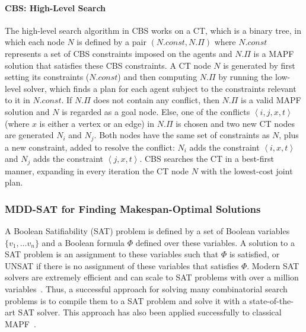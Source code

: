 \documentclass[review]{elsarticle}
\newcommand{\tuple}[1]{\ensuremath{\left \langle #1 \right \rangle }}
\newcommand\konstantin[1]{\nb{\textbf{Konstantin:}}{red}{#1}}
\newcommand\roni[1]{\nb{\textbf{Roni:}}{green}{#1}}
\newcommand{\cbs}{\ac{CBS}\xspace}
\newcommand{\ct}{\ac{CT}\xspace}
\newcommand{\mddsat}{MDD-SAT\xspace}
\newcommand{\mapf}{\ac{MAPF}\xspace}
\newcommand{\const}{\textit{const}\xspace}
\begin{document}
\paragraph{\textbf{\cbs: High-Level Search}}
The high-level search algorithm in \cbs works on a \ct, which is a binary tree, in which each node
$N$ is defined by a pair $(N.\const, N.\Pi)$ where 
$N.\const$ represents a set of \cbs constraints imposed on the agents and $N.\Pi$ is a \mapf solution that satisfies these \cbs constraints. A \ct node $N$ is generated by first setting its constraints ($N.\const$) and then 
computing $N.\Pi$ by running the low-level solver, which finds a plan for each agent subject to the constraints relevant to it in $N.\const$. If $N.\Pi$ does not contain any conflict, then $N.\Pi$ is a valid \mapf solution and $N$ is regarded as a goal node. Else, one of the conflicts $\tuple{i,j,x,t}$ (where $x$ is either a vertex or an edge) in $N.\Pi$ is chosen and two new \ct nodes are generated $N_i$ and $N_j$. Both nodes have the same set of constraints as $N$, plus a new constraint, added to resolve the conflict: $N_i$ adds the constraint $\tuple{i,x,t}$
and $N_j$ adds the constraint $\tuple{j,x,t}$. \cbs searches the \ct in a best-first manner, expanding in every iteration the \ct node $N$ with the lowest-cost joint plan. %


\subsubsection{\mddsat for Finding Makespan-Optimal Solutions}


A Boolean Satifiability (SAT) problem is defined by a set of Boolean variables $\{v_1,\ldots v_n\}$ and a Boolean formula $\Phi$ defined over these variables. 
A solution to a SAT problem is an assignment to these variables such that $\Phi$ is satisfied, or UNSAT if there is no assignment of these variables that satisfies $\Phi$. 
Modern SAT solvers are extremely efficient and can scale to SAT problems with over a million variables~\cite{DBLP:conf/sat/AudemardLS13,audemard2018glucose}.
Thus, a successful approach for solving many combinatorial search problems is to compile them to a SAT problem and solve it with a state-of-the-art SAT solver. This approach has also been applied successfully to classical \mapf~\cite{DBLP:conf/ecai/SurynekFSB16,surynek17expansion}. 
\end{document}
